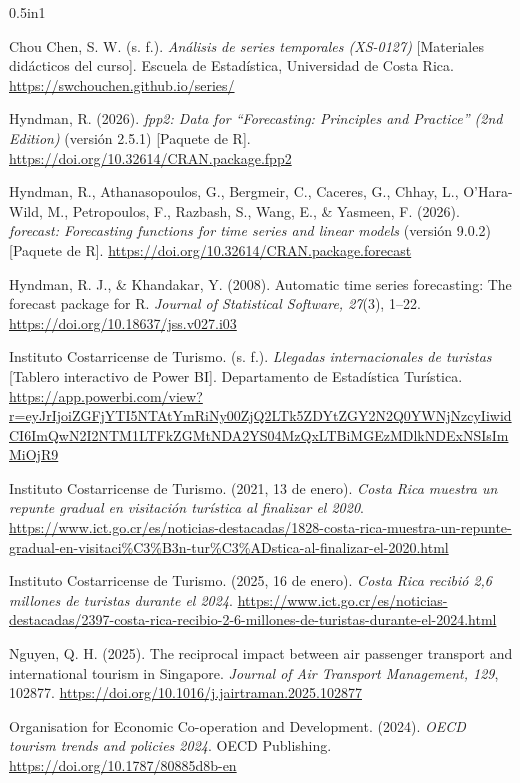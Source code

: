 \documentclass[12pt]{article}
\begin{document}
\begin{hangparas}{0.5in}{1}

Chou Chen, S. W. (s. f.). 
\textit{Análisis de series temporales (XS-0127)}
[Materiales didácticos del curso]. 
Escuela de Estadística, Universidad de Costa Rica.
\url{https://swchouchen.github.io/series/}

Hyndman, R. (2026). \textit{fpp2: Data for 
``Forecasting: Principles and Practice'' (2nd Edition)} 
(versión 2.5.1) [Paquete de R].
\url{https://doi.org/10.32614/CRAN.package.fpp2}

Hyndman, R., Athanasopoulos, G., Bergmeir, C., 
Caceres, G., Chhay, L., O'Hara-Wild, M., 
Petropoulos, F., Razbash, S., Wang, E., \& Yasmeen, F. 
(2026). \textit{forecast: Forecasting functions for time 
series and linear models} (versión 9.0.2) [Paquete de R].
\url{https://doi.org/10.32614/CRAN.package.forecast}

Hyndman, R. J., \& Khandakar, Y. (2008). 
Automatic time series forecasting: The forecast package 
for R. \textit{Journal of Statistical Software, 27}(3), 
1--22.
\url{https://doi.org/10.18637/jss.v027.i03}

Instituto Costarricense de Turismo. (s. f.).
\textit{Llegadas internacionales de turistas}
[Tablero interactivo de Power BI].
Departamento de Estadística Turística.
\url{https://app.powerbi.com/view?r=eyJrIjoiZGFjYTI5NTAtYmRiNy00ZjQ2LTk5ZDYtZGY2N2Q0YWNjNzcyIiwidCI6ImQwN2I2NTM1LTFkZGMtNDA2YS04MzQxLTBiMGEzMDlkNDExNSIsImMiOjR9}

Instituto Costarricense de Turismo. (2021, 13 de enero). 
\textit{Costa Rica muestra un repunte gradual en 
visitación turística al finalizar el 2020}.
\url{https://www.ict.go.cr/es/noticias-destacadas/1828-costa-rica-muestra-un-repunte-gradual-en-visitaci%C3%B3n-tur%C3%ADstica-al-finalizar-el-2020.html}

Instituto Costarricense de Turismo. (2025, 16 de enero). 
\textit{Costa Rica recibió 2,6 millones de turistas 
durante el 2024}.
\url{https://www.ict.go.cr/es/noticias-destacadas/2397-costa-rica-recibio-2-6-millones-de-turistas-durante-el-2024.html}

Nguyen, Q. H. (2025). The reciprocal impact between air 
passenger transport and international tourism in Singapore. 
\textit{Journal of Air Transport Management, 129}, 102877.
\url{https://doi.org/10.1016/j.jairtraman.2025.102877}

Organisation for Economic Co-operation and Development. 
(2024). \textit{OECD tourism trends and policies 2024}. 
OECD Publishing.
\url{https://doi.org/10.1787/80885d8b-en}


\end{hangparas}
\end{document}
